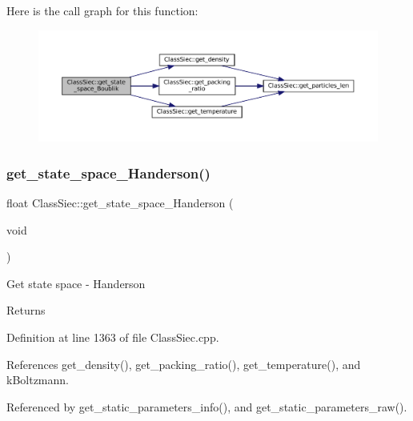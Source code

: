 Here is the call graph for this function\+:
\nopagebreak
\begin{figure}[H]
\begin{center}
\leavevmode
\includegraphics[width=350pt]{classClassSiec_a8fb2e1fa04229aaa6027fed8dd996aea_cgraph}
\end{center}
\end{figure}
\mbox{\label{classClassSiec_a36144a1734674d3f0c6899c348da1a97}} 
\subsubsection{\texorpdfstring{get\+\_\+state\+\_\+space\+\_\+\+Handerson()}{get\_state\_space\_Handerson()}}
{\footnotesize\ttfamily float Class\+Siec\+::get\+\_\+state\+\_\+space\+\_\+\+Handerson (\begin{DoxyParamCaption}\item[{void}]{ }\end{DoxyParamCaption})}

Get state space -\/ Handerson \begin{DoxyReturn}{Returns}

\end{DoxyReturn}


Definition at line 1363 of file Class\+Siec.\+cpp.



References get\+\_\+density(), get\+\_\+packing\+\_\+ratio(), get\+\_\+temperature(), and k\+Boltzmann.



Referenced by get\+\_\+static\+\_\+parameters\+\_\+info(), and get\+\_\+static\+\_\+parameters\+\_\+raw().

